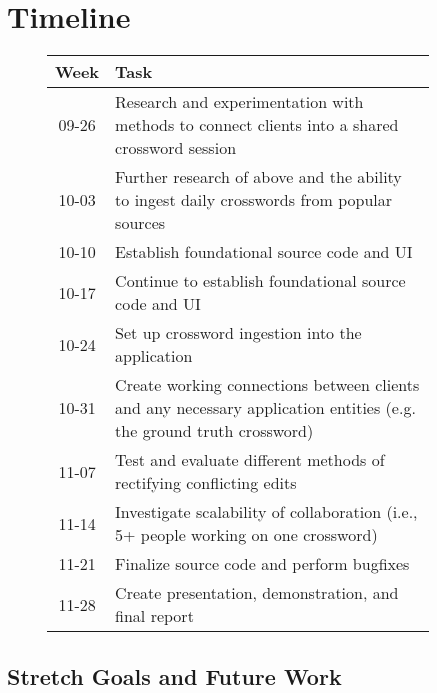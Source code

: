 \documentclass{article}
\begin{document}
\section{Timeline}
\label{timeline}
\begin{figure}[h]
  \centering
  \begin{tabular}{| c | p{0.9\linewidth} |}
    \hline
    \textbf{Week} & \textbf{Task} \\ \hline
    09-26 & Research and experimentation with methods to connect
            clients into a shared crossword session \\ \hline
    10-03 & Further research of above and the ability to
            ingest daily crosswords from popular sources \\ \hline
    10-10 & Establish foundational source code and UI \\ \hline
    10-17 & Continue to establish foundational source code and UI \\ \hline
    10-24 & Set up crossword ingestion into the application \\ \hline
    10-31 & Create working connections between clients and any
            necessary application entities (e.g. the ground truth crossword) \\ \hline
    11-07 & Test and evaluate different methods of rectifying conflicting edits  \\ \hline
    11-14 & Investigate scalability of collaboration (i.e., 5+ people working on one crossword) \\ \hline
    11-21 & Finalize source code and perform bugfixes \\ \hline
    11-28 & Create presentation, demonstration, and final report \\ \hline

    \end{tabular}
\end{figure}

\subsection{Stretch Goals and Future Work}

\newpage


\end{document}
